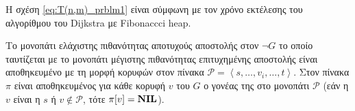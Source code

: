 Η σχέση \eqref{eq:T(n,m)_prblm1} είναι σύμφωνη με τον χρόνο εκτέλεσης του αλγορίθμου του Dijkstra με Fibonaccci heap. 

Το μονοπάτι ελάχιστης πιθανότητας αποτυχούς αποστολής στον $\lnot G$ το οποίο ταυτίζεται με το μονοπάτι μέγιστης πιθανότητας επιτυχημένης αποστολής είναι αποθηκευμένο με τη μορφή κορυφών στον πίνακα $\mathcal{P}=\left\langle s,\ldots,v_i,\ldots,t\right\rangle$. Στον πίνακα $\pi$ είναι αποθηκευμένος για κάθε κορυφή $v$ του $G$ ο γονέας της στο μονοπάτι $\mathcal{P}$ (εάν η $v$ είναι η $s$ ή $v\notin\mathcal{P}$, τότε $\pi[v]={\textbf{NIL}}$).